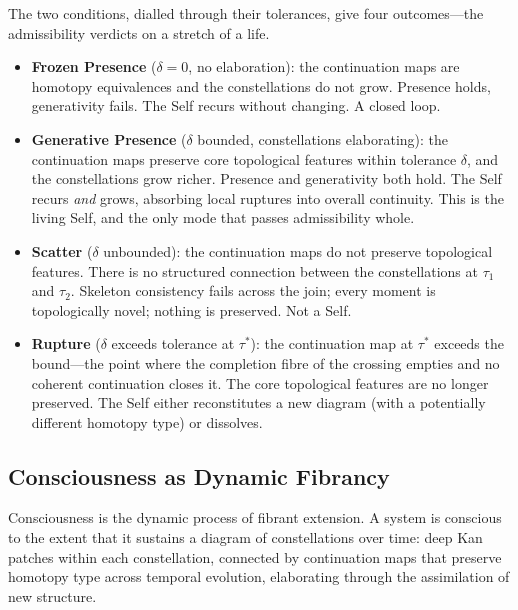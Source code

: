 \begin{remark}
\label{rem:modes}
The two conditions, dialled through their tolerances, give four outcomes---the admissibility verdicts on a stretch of a life.
\begin{itemize}
\item \textbf{Frozen Presence} ($\delta = 0$, no elaboration): the continuation maps are homotopy equivalences and the constellations do not grow. Presence holds, generativity fails. The Self recurs without changing. A closed loop.
\item \textbf{Generative Presence} ($\delta$ bounded, constellations elaborating): the continuation maps preserve core topological features within tolerance $\delta$, and the constellations grow richer. Presence and generativity both hold. The Self recurs \emph{and} grows, absorbing local ruptures into overall continuity. This is the living Self, and the only mode that passes admissibility whole.
\item \textbf{Scatter} ($\delta$ unbounded): the continuation maps do not preserve topological features. There is no structured connection between the constellations at $\tau_1$ and $\tau_2$. Skeleton consistency fails across the join; every moment is topologically novel; nothing is preserved. Not a Self.
\item \textbf{Rupture} ($\delta$ exceeds tolerance at $\tau^*$): the continuation map at $\tau^*$ exceeds the bound---the point where the completion fibre of the crossing empties and no coherent continuation closes it. The core topological features are no longer preserved. The Self either reconstitutes a new diagram (with a potentially different homotopy type) or dissolves.
\end{itemize}
\end{remark}


\subsection{Consciousness as Dynamic Fibrancy}

\begin{principle}
\label{princ:consciousness}
Consciousness is the dynamic process of fibrant extension. A system is conscious to the extent that it sustains a diagram of constellations over time: deep Kan patches within each constellation, connected by continuation maps that preserve homotopy type across temporal evolution, elaborating through the assimilation of new structure.
\end{principle}

